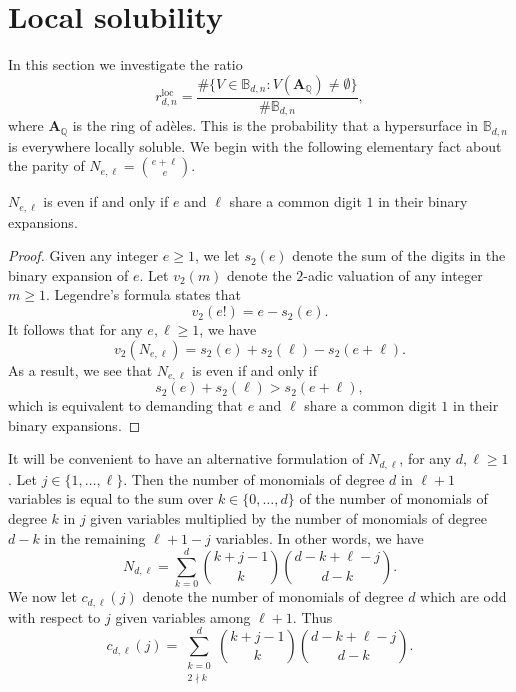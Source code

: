 \documentclass[11pt, reqno]{amsart}
\numberwithin{equation}{section}
\renewcommand{\geq}{\geqslant}
\begin{document}
\section{Local solubility}\label{s:local}

In this section we investigate the ratio
\begin{equation*}
r_{d,n}^{\mathrm{loc}} = \frac{\# \{ V \in \mathbb{B}_{d,n} : V(\mathbf{A}_{\mathbb{Q}}) \neq \emptyset \}}{\# \mathbb{B}_{d,n}},
\end{equation*}
where $\mathbf{A}_{\mathbb{Q}}$ is the ring of ad\`eles. This is  the probability that a hypersurface in $\mathbb{B}_{d,n}$ is everywhere locally soluble.  We begin with the following elementary fact about the parity of 
$N_{e,\ell} = \binom{e+\ell}{e}$. 

\begin{lemma}\label{lem:N-even}
$N_{e,\ell}$ is even if and only if 
$e$ and $\ell$ share a common digit $1$ in their binary expansions.
\end{lemma}

\begin{proof}
Given any integer $e \geq 1$, we let $s_2(e)$ denote the sum of the digits in the binary expansion of $e$. Let  $v_2(m)$ denote the $2$-adic valuation of any integer $m \geq 1$. Legendre's formula states that 
\begin{equation*}
v_2(e!) = e - s_2(e).
\end{equation*}
It follows that for any $e, \ell \geq 1$, we have
\begin{equation}
\label{Equality valuation}
v_2 ( N_{e,\ell} ) = s_2(e) + s_2(\ell) - s_2(e+\ell).
\end{equation}
As a result, we see that $N_{e,\ell}$ is even if and only if
\begin{equation*}
s_2(e) + s_2(\ell) > s_2(e+\ell),
\end{equation*}
which is equivalent to demanding that $e$ and $\ell$ share a common digit $1$ in their binary expansions.
\end{proof}


It will be convenient to have an alternative formulation of 
$N_{d,\ell}$, for any  $d, \ell \geq 1$. Let  $j \in \{1, \dots, \ell\}$. Then the number of monomials of degree $d$ in $\ell+1$ variables is equal to the sum over $k \in \{0, \dots, d\}$ of the number of monomials of degree $k$ in $j$ given variables multiplied by the number of monomials of degree $d-k$ in the remaining $\ell+1-j$ variables. In other words, we have
\begin{equation}
\label{Equality number monomials}
N_{d,\ell} = \sum_{k=0}^d \binom{k+j-1}{k} \binom{d-k+\ell-j}{d-k}.
\end{equation}
We now let $c_{d,\ell}(j)$ denote the number of monomials of degree $d$ which are odd with respect to $j$ given variables among $\ell+1$. Thus 
\begin{equation}
\label{Definition c}
c_{d,\ell}(j) = \sum_{\substack{k=0 \\ 2 \nmid k}}^d \binom{k+j-1}{k} \binom{d-k+\ell-j}{d-k}.
\end{equation}
\end{document}
